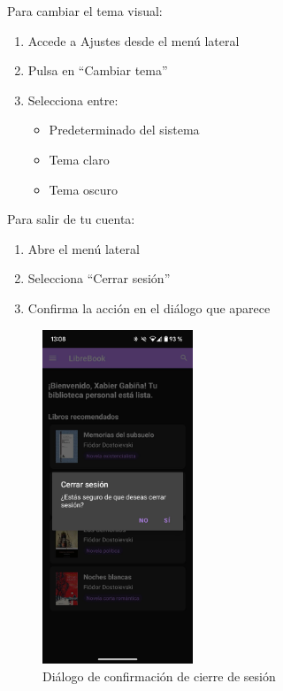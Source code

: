 \documentclass[a4paper,12pt]{report}
\begin{document}
    Para cambiar el tema visual:
    \begin{enumerate}
      \item Accede a Ajustes desde el menú lateral
      \item Pulsa en ``Cambiar tema''
      \item Selecciona entre:
      \begin{itemize}
        \item Predeterminado del sistema
        \item Tema claro
        \item Tema oscuro
      \end{itemize}
    \end{enumerate}
    
    
    Para salir de tu cuenta:
    \begin{enumerate}
      \item Abre el menú lateral
      \item Selecciona ``Cerrar sesión''
      \item Confirma la acción en el diálogo que aparece
    \end{enumerate}
    
    \begin{figure}[H]
      \centering
      \includegraphics[width=0.4\textwidth]{.img/logout.png}
      \caption{Diálogo de confirmación de cierre de sesión}
      \label{fig:logout}
    \end{figure} 
\end{document}
